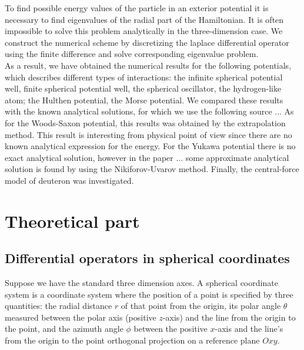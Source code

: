 \documentclass[a4paper, 14pt]{article}
\begin{document}
To find possible energy values of the particle in an exterior potential it is necessary to find eigenvalues of the radial part of the Hamiltonian. It is often impossible to solve this problem analytically in the three-dimension case. We construct the  numerical scheme by discretizing the laplace differential operator using the finite difference and solve corresponding eigenvalue problem. \\
As a result, we have obtained the numerical results for the following potentials, which describes different types of interactions: the infinite spherical potential well, finite spherical potential well, the spherical oscillator, the hydrogen-like atom; the Hulthen potential, the Morse potential.  We  compared these results with the known analytical solutions, for which we use the following source ... As for  the Woods-Saxon potential, this results was obtained by the extrapolation method. This result is interesting  from physical point of view since there are no known analytical expression for the energy. For the Yukawa potential  there is no exact analytical solution, however in the paper ... some approximate analytical solution is found by using the Nikiforov-Uvarov method. 
Finally,  the central-force model of deuteron was investigated.


\section{Theoretical part}
\subsection{Differential operators in spherical coordinates}\label{dif_op_3d}


Suppose we have the standard three dimension axes. A spherical coordinate system is a coordinate system where the position of a point is specified by three quantities: the radial distance $r$ of that point from the origin, its polar angle $\theta$ measured between the polar axis (positive $z$-axis) and the line from the origin to the point, and the azimuth angle $\phi$ between the positive $x$-axis  and the line's from the origin to the point orthogonal projection on a reference plane $Oxy$.
\end{document}
